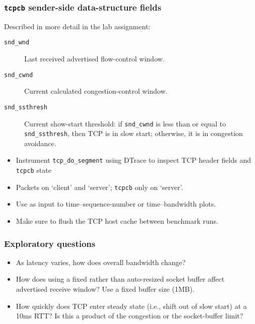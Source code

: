\begin{frame}
  \frametitle{\texttt{tcpcb} sender-side data-structure fields}

  Described in more detail in the lab assignment:

  \medskip

  \begin{description}
    \item[\texttt{snd\_wnd}] Last received advertised flow-control window.
    \item[\texttt{snd\_cwnd}] Current calculated congestion-control window.
    \item[\texttt{snd\_ssthresh}] Current show-start threshold: if
      \texttt{snd\_cwnd} is less than or equal to \texttt{snd\_ssthresh}, then
      TCP is in slow start; otherwise, it is in congestion avoidance.
  \end{description}

  \medskip

  \begin{itemize}
    \item Instrument \texttt{tcp\_do\_segment} using DTrace to inspect TCP
      header fields and \texttt{tcpcb} state
    \item Packets on `client' and `server'; \texttt{tcpcb} only on `server'.
    \item Use as input to time--sequence-number or time--bandwidth plots.
    \item Make sure to flush the TCP host cache between benchmark runs.
  \end{itemize}
\end{frame}

\begin{frame}
  \frametitle{Exploratory questions}

  \begin{itemize}
    \item As latency varies, how does overall bandwidth change?
    \item How does using a fixed rather than auto-resized socket buffer affect
      advertised receive window?  Use a fixed buffer size (1MB).
    \item How quickly does TCP enter steady state (i.e., shift out of slow
      start) at a 10ms RTT?
      Is this a product of the congestion or the socket-buffer limit?
  \end{itemize}
\end{frame}

